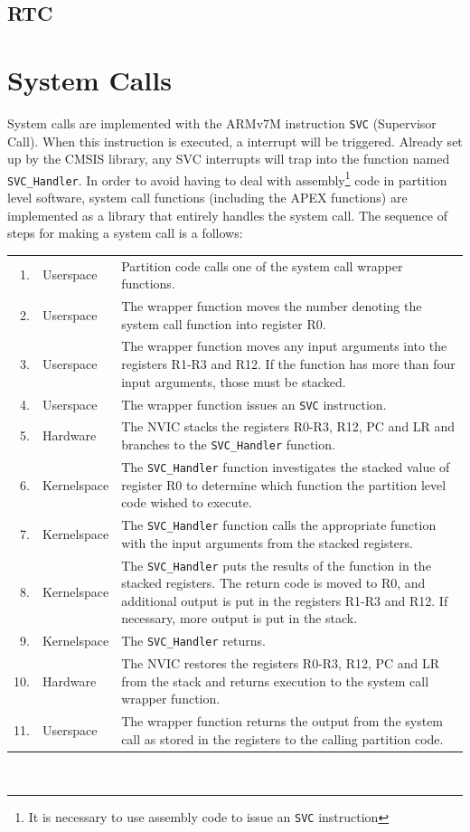 \subsection{RTC}

\section{System Calls}
System calls are implemented with the ARMv7M instruction \texttt{SVC} (Supervisor
Call). When this instruction is executed, a interrupt will be triggered. Already
set up by the CMSIS library, any SVC interrupts will trap into the function
named \texttt{SVC\_Handler}.
In order to avoid having to deal with assembly\footnote{It is necessary to use
assembly code to issue an \texttt{SVC} instruction} code in partition level
software, system call functions (including the APEX functions) are implemented
as a library that entirely handles the system call.
The sequence of steps for making a system call is a follows:\\

\begin{tabular}{ r l p{10.5cm} }
    1. & Userspace & Partition code calls one of the system call wrapper
    functions.\\
    2. & Userspace & The wrapper function moves the number denoting the system
    call function into register R0.\\
    3. & Userspace & The wrapper function moves any input arguments into the
    registers R1-R3 and R12. If the function has more than four input arguments,
    those must be stacked.\\
    4. & Userspace & The wrapper function issues an \texttt{SVC} instruction.\\
    5. & Hardware & The NVIC stacks the registers R0-R3, R12, PC and LR and
    branches to the \texttt{SVC\_Handler} function.\\
    6. & Kernelspace & The \texttt{SVC\_Handler} function investigates the
    stacked value of register R0 to determine which function the partition level
    code wished to execute.\\
    7. & Kernelspace & The \texttt{SVC\_Handler} function calls the appropriate
    function with the input arguments from the stacked registers.\\
    8. & Kernelspace & The \texttt{SVC\_Handler} puts the results of the
    function in the stacked registers. The return code is moved to R0, and
    additional output is put in the registers R1-R3 and R12. If necessary, more
    output is put in the stack.\\
    9. & Kernelspace & The \texttt{SVC\_Handler} returns.\\
    10. & Hardware & The NVIC restores the registers R0-R3, R12, PC and LR from
    the stack and returns execution to the system call wrapper function.\\
    11. & Userspace & The wrapper function returns the output from the system
    call as stored in the registers to the calling partition code.\\
\end{tabular}\\


